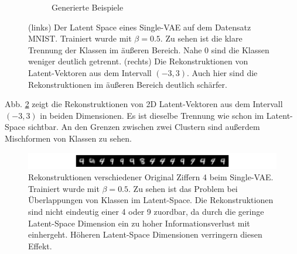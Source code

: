 \begin{figure}[hbt]
\begin{subfigure}{.5\textwidth}
  \caption{Generierte Beispiele}
  \label{fig:mnist_reconstructions}
\end{subfigure}
\caption{(links) Der Latent Space eines Single-VAE auf dem Datensatz MNIST. Trainiert wurde mit $\beta = 0.5$. Zu sehen ist die klare Trennung der Klassen im äußeren Bereich. Nahe 0 sind die Klassen weniger deutlich getrennt. (rechts) Die Rekonstruktionen von Latent-Vektoren aus dem Intervall $(-3, 3)$. Auch hier sind die Rekonstruktionen im äußeren Bereich deutlich schärfer.}
\end{figure}

Abb. \ref{fig:mnist_reconstructions} zeigt die Rekonstruktionen von 2D Latent-Vektoren aus dem Intervall $(-3, 3)$ in beiden Dimensionen. Es ist dieselbe Trennung wie schon im Latent-Space sichtbar. An den Grenzen zwischen zwei Clustern sind außerdem Mischformen von Klassen zu sehen.

\begin{figure}[hbt]
  \centering
  \includegraphics[width=\textwidth]{gfx/evaluation/feature_space/mnist_4}
  \caption{Rekonstruktionen verschiedener Original Ziffern 4 beim Single-VAE. Trainiert wurde mit $\beta = 0.5$. Zu sehen ist das Problem bei Überlappungen von Klassen im Latent-Space. Die Rekonstruktionen sind nicht eindeutig einer 4 oder 9 zuordbar, da durch die geringe Latent-Space Dimension ein zu hoher Informationsverlust mit einhergeht. Höheren Latent-Space Dimensionen verringern diesen Effekt.}
  \label{fig:mnist_recon_4}
\end{figure}


